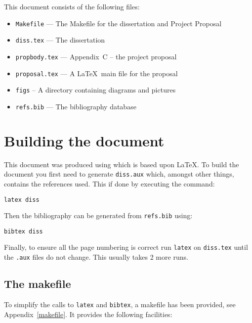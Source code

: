 \documentclass[12pt,twoside,notitlepage]{report}
\begin{document}
This document consists of the following files:

\begin{itemize}
\item {\tt Makefile} --- The Makefile for the dissertation and Project Proposal
\item {\tt diss.tex} --- The dissertation
\item {\tt propbody.tex} --- Appendix~C  -- the project proposal 
\item {\tt proposal.tex}  --- A \LaTeX\ main file for the proposal 
\item{\tt figs} -- A directory containing diagrams and pictures
\item{\tt refs.bib} --- The bibliography database
\end{itemize}

\section{Building the document}

This document was produced using \LaTeXe which is based upon
\LaTeX\cite{Lamport86}.  To build the document you first need to
generate {\tt diss.aux} which, amongst other things, contains the
references used.  This if done by executing the command:

{\tt latex diss}

\noindent
Then the bibliography can be generated from {\tt refs.bib} using:

{\tt bibtex diss}

\noindent
Finally, to ensure all the page numbering is correct run {\tt latex}
on {\tt diss.tex} until the {\tt .aux} files do not change.  This
usually takes 2 more runs.

\subsection{The makefile}

To simplify the calls to {\tt latex} and {\tt bibtex}, 
a makefile has been provided, see Appendix~\ref{makefile}. 
It provides the following facilities:
\end{document}
